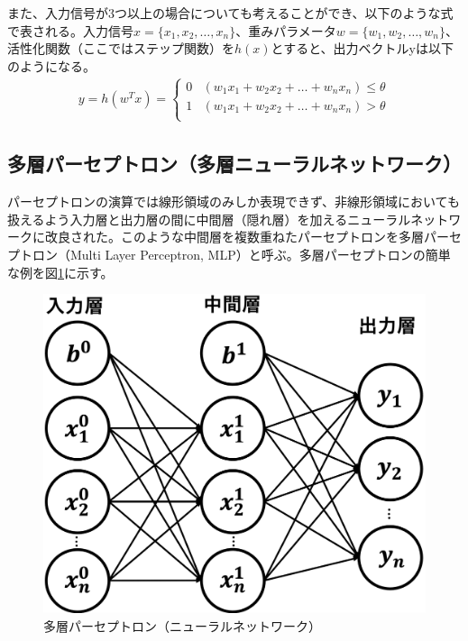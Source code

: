 また、入力信号が3つ以上の場合についても考えることができ、以下のような式で表される。入力信号$x = \{ x_1, x_2, \ldots, x_n \}$、重みパラメータ$w = \{ w_1, w_2, \ldots, w_n \}$、活性化関数（ここではステップ関数）を$h(x)$とすると、出力ベクトルyは以下のようになる。
\begin{align}
y = h(w^T x) =
 \begin{cases}
 0 & (w_1x_1 + w_2x_2 + \ldots + w_nx_n) \leq \theta\\
 1 & (w_1x_1 + w_2x_2 + \ldots + w_nx_n) > \theta \\
 \end{cases}
\end{align}
\subsection{多層パーセプトロン（多層ニューラルネットワーク）}
パーセプトロンの演算では線形領域のみしか表現できず、非線形領域においても扱えるよう入力層と出力層の間に中間層（隠れ層）を加えるニューラルネットワークに改良された。このような中間層を複数重ねたパーセプトロンを多層パーセプトロン（Multi Layer Perceptron, MLP）と呼ぶ。多層パーセプトロンの簡単な例を図\ref{mlp}に示す。\\
\begin{figure}[H]
	\begin{center}
 \includegraphics[keepaspectratio, scale=0.2]
 	{Figure/Deeplearning/mlp.png}
 		\caption{多層パーセプトロン（ニューラルネットワーク）}
 		\label{mlp}
	\end{center}
\end{figure}
